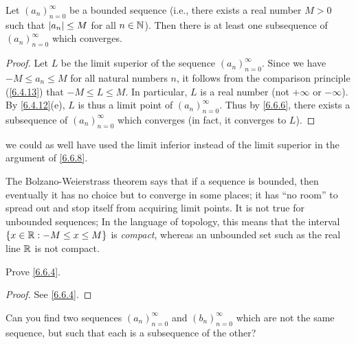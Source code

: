 \begin{thm}\label{6.6.8}
  Let \((a_n)_{n = 0}^\infty\) be a bounded sequence
  (i.e., there exists a real number \(M > 0\) such that \(\left\lvert a_n\right\rvert \leq M\) for all \(n \in \mathbb{N}\)).
  Then there is at least one subsequence of \((a_n)_{n = 0}^\infty\) which converges.
\end{thm}

\begin{proof}
  Let \(L\) be the limit superior of the sequence \((a_n)_{n = 0}^\infty\).
  Since we have \(-M \leq a_n \leq M\) for all natural numbers \(n\), it follows from the comparison principle (\cref{6.4.13}) that \(-M \leq L \leq M\).
  In particular, \(L\) is a real number (not \(+\infty\) or \(-\infty\)).
  By \cref{6.4.12}(e), \(L\) is thus a limit point of \((a_n)_{n = 0}^\infty\).
  Thus by \cref{6.6.6}, there exists a subsequence of \((a_n)_{n = 0}^\infty\) which converges
  (in fact, it converges to \(L\)).
\end{proof}

\begin{note}
  we could as well have used the limit inferior instead of the limit superior in the argument of \cref{6.6.8}.
\end{note}

\begin{rmk}\label{6.6.9}
  The Bolzano-Weierstrass theorem says that if a sequence is bounded, then eventually it has no choice but to converge in some places;
  it has ``no room'' to spread out and stop itself from acquiring limit points.
  It is not true for unbounded sequences;
  In the language of topology, this means that the interval \(\left\lbrace x \in \mathbb{R} : -M \leq x \leq M\right\rbrace\) is \emph{compact}, whereas an unbounded set such as the real line \(\mathbb{R}\) is not compact.
\end{rmk}

\exercisesection

\begin{ex}\label{ex:6.6.1}
  Prove \cref{6.6.4}.
\end{ex}

\begin{proof}
  See \cref{6.6.4}.
\end{proof}

\begin{ex}\label{ex:6.6.2}
  Can you find two sequences \((a_n)_{n = 0}^\infty\) and \((b_n)_{n = 0}^\infty\) which are not the same sequence, but such that each is a subsequence of the other?
\end{ex}

